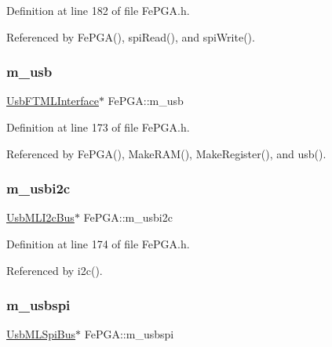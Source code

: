 Definition at line 182 of file Fe\+P\+G\+A.\+h.



Referenced by Fe\+P\+G\+A(), spi\+Read(), and spi\+Write().

\mbox{\label{classFePGA_afb7947e600a66d914ee524acec3d8b1f}} 
\subsubsection{\texorpdfstring{m\+\_\+usb}{m\_usb}}
{\footnotesize\ttfamily \hyperlink{classUsbFTMLInterface}{Usb\+F\+T\+M\+L\+Interface}$\ast$ Fe\+P\+G\+A\+::m\+\_\+usb\hspace{0.3cm}{\ttfamily [private]}}



Definition at line 173 of file Fe\+P\+G\+A.\+h.



Referenced by Fe\+P\+G\+A(), Make\+R\+A\+M(), Make\+Register(), and usb().

\mbox{\label{classFePGA_a09fdde4002008daa0d15672772dd4483}} 
\subsubsection{\texorpdfstring{m\+\_\+usbi2c}{m\_usbi2c}}
{\footnotesize\ttfamily \hyperlink{classUsbMLI2cBus}{Usb\+M\+L\+I2c\+Bus}$\ast$ Fe\+P\+G\+A\+::m\+\_\+usbi2c\hspace{0.3cm}{\ttfamily [private]}}



Definition at line 174 of file Fe\+P\+G\+A.\+h.



Referenced by i2c().

\mbox{\label{classFePGA_a922a56250b29c9842cdb8095cae8c976}} 
\subsubsection{\texorpdfstring{m\+\_\+usbspi}{m\_usbspi}}
{\footnotesize\ttfamily \hyperlink{classUsbMLSpiBus}{Usb\+M\+L\+Spi\+Bus}$\ast$ Fe\+P\+G\+A\+::m\+\_\+usbspi\hspace{0.3cm}{\ttfamily [private]}}



